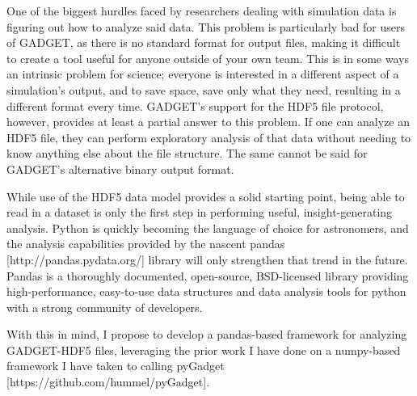 One of the biggest hurdles faced by researchers dealing with simulation data is figuring out how to analyze said data.  This problem is particularly bad for users of GADGET, as there is no standard format for output files, making it difficult to create a tool useful for anyone outside of your own team.  This is in some ways an intrinsic problem for science; everyone is interested in a different aspect of a simulation’s output, and to save space, save only what they need, resulting in a different format every time.  GADGET’s support for the HDF5 file protocol, however, provides at least a partial answer to this problem.  If one can analyze an HDF5 file, they can perform exploratory analysis of that data without needing to know anything else about the file structure.  The same cannot be said for GADGET’s alternative binary output format.  

While use of the HDF5 data model provides a solid starting point, being able to read in a dataset is only the first step in performing useful, insight-generating analysis.  Python is quickly becoming the language of choice for astronomers, and the analysis capabilities provided by the nascent pandas [http://pandas.pydata.org/] library will only strengthen that trend in the future.  Pandas is a thoroughly documented, open-source, BSD-licensed library providing high-performance, easy-to-use data structures and data analysis tools for python with a strong community of developers.  

With this in mind, I propose to develop a pandas-based framework for analyzing GADGET-HDF5 files, leveraging the prior work I have done on a numpy-based framework I have taken to calling pyGadget [https://github.com/hummel/pyGadget].